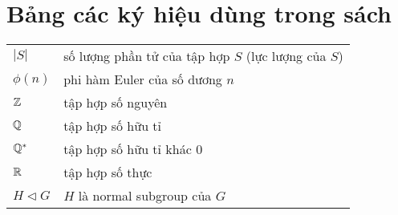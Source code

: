 \section*{Bảng các ký hiệu dùng trong sách}

\begin{table}[h]
    \begin{tabular}{l l}
        $|S|$ & số lượng phần tử của tập hợp $S$ (lực lượng của $S$) \\
        $\phi(n)$ & phi hàm Euler của số dương $n$ \\
        $\mathbb{Z}$ & tập hợp số nguyên \\
        $\mathbb{Q}$ & tập hợp số hữu tỉ \\
        $\mathbb{Q}^*$ & tập hợp số hữu tỉ khác 0 \\
        $\mathbb{R}$ & tập hợp số thực \\
        $H \triangleleft G$ & $H$ là normal subgroup của $G$
    \end{tabular}
\end{table}

\newpage